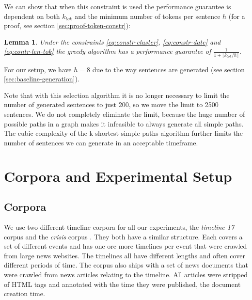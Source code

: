 \documentclass[a4paper,BCOR=10mm]{report}
\newtheorem{lemma}{Lemma}
\numberwithin{lemma}{chapter}
\numberwithin{definition}{chapter}
\begin{document}
We can show that when this constraint is used the performance guarantee is dependent on both $k_{tok}$ and the minimum number of tokens per sentence $h$ (for a proof, see section \ref{sec:proof-token-constr}):
\begin{lemma}
Under the constraints \ref{eq:constr-cluster}, \ref{eq:constr-date} and \ref{eq:contr-len-tok} the greedy algorithm has a performance guarantee of $\frac{1}{1 + \lfloor k_{\mathit{tok}} / h \rfloor}$.
\end{lemma}

For our setup, we have $h = 8$ due to the way sentences are generated (see section \ref{sec:baseline-generation}).





Note that with this selection algorithm it is no longer necessary to limit the number of generated sentences to just 200, so we move the limit to 2500 sentences.
We do not completely eliminate the limit, because the huge number of possible paths in a graph makes it infeasible to always generate all simple paths. The cubic complexity of the k-shortest simple paths algorithm further limits the number of sentences we can generate in an acceptable timeframe.

\chapter{Corpora and Experimental Setup} \label{sec:setup}

\section{Corpora} \label{sec:corpora}

We use two different timeline corpora for all our experiments, the \textit{timeline 17} corpus \citep{tran-tl17} and the \textit{crisis} corpus \citep{tran-headline}. They both have a similar structure. Each covers a set of different events and has one ore more timelines per event that were crawled from large news websites. The timelines all have different lengths and often cover different periods of time. The corpus also ships with a set of news documents that were crawled from news articles relating to the timeline. All articles were stripped of HTML tags and annotated with the time they were published, the document creation time.
\end{document}
